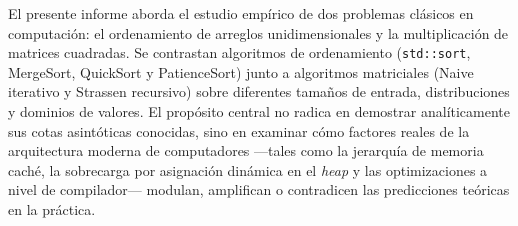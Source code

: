 El presente informe aborda el estudio empírico de dos problemas clásicos en computación: el ordenamiento de arreglos unidimensionales y la multiplicación de matrices cuadradas. Se contrastan algoritmos de ordenamiento (\texttt{std::sort}, MergeSort, QuickSort y PatienceSort) junto a algoritmos matriciales (Naive iterativo y Strassen recursivo) sobre diferentes tamaños de entrada, distribuciones y dominios de valores. El propósito central no radica en demostrar analíticamente sus cotas asintóticas conocidas, sino en examinar cómo factores reales de la arquitectura moderna de computadores —tales como la jerarquía de memoria caché, la sobrecarga por asignación dinámica en el \textit{heap} y las optimizaciones a nivel de compilador— modulan, amplifican o contradicen las predicciones teóricas en la práctica.